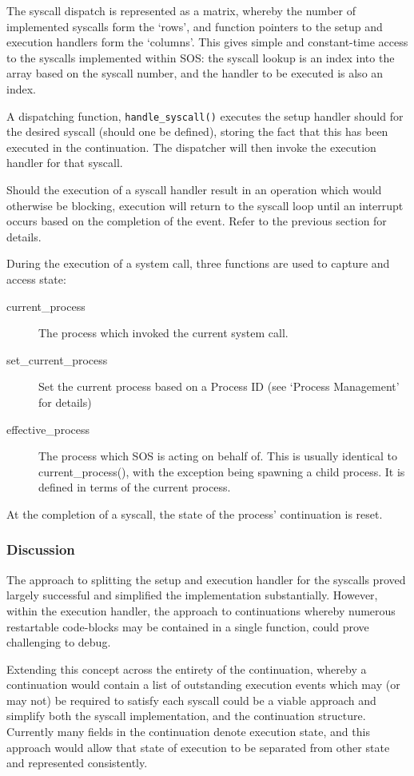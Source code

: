 \documentclass[a4paper,12pt]{article}
\begin{document}
The syscall dispatch is represented as a matrix, whereby the number of
implemented syscalls form the `rows', and function pointers to the setup and
execution handlers form the `columns'.  This gives simple and constant-time
access to the syscalls implemented within SOS: the syscall lookup is an index
into the array based on the syscall number, and the handler to be executed is
also an index.

A dispatching function, \texttt{handle\_syscall()} executes the setup handler
should for the desired syscall (should one be defined), storing the fact that
this has been executed in the continuation.  The dispatcher will then invoke
the execution handler for that syscall.

Should the execution of a syscall handler result in an operation which would
otherwise be blocking, execution will return to the syscall loop until an
interrupt occurs based on the completion of the event.  Refer to the previous
section for details.

During the execution of a system call, three functions are used to capture and
access state:
\begin{description}
\item[current\_process] The process which invoked the current system call.
\item[set\_current\_process] Set the current process based on a Process ID (see
  `Process Management' for details)
\item[effective\_process] The process which SOS is acting on behalf of.  This
  is usually identical to current\_process(), with the exception being spawning
  a child process.  It is defined in terms of the current process.
\end{description}
At the completion of a syscall, the state of the process' continuation is
reset.

\subsubsection{Discussion}
The approach to splitting the setup and execution handler for the syscalls
proved largely successful and simplified the implementation substantially.  However,
within the execution handler, the approach to continuations whereby numerous
restartable code-blocks may be contained in a single function, could prove
challenging to debug.

Extending this concept across the entirety of the continuation, whereby a
continuation would contain a list of outstanding execution events which may
(or may not) be required to satisfy each syscall could be a viable approach
and simplify both the syscall implementation, and the continuation structure.
Currently many fields in the continuation denote execution state, and this
approach would allow that state of execution to be separated from other state
and represented consistently.
\end{document}
